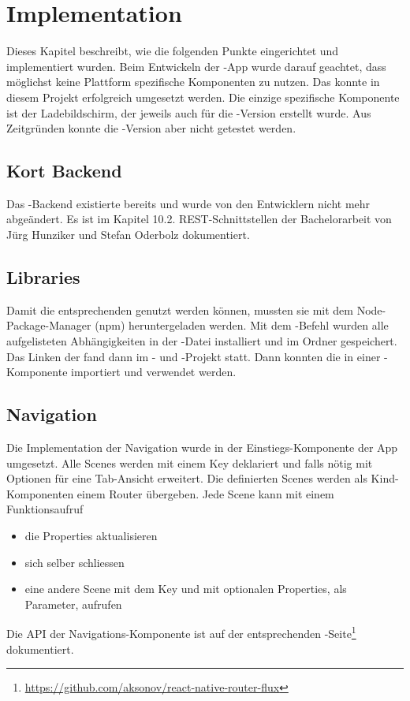 \chapter{Implementation}
\label{pd-implementation}
Dieses Kapitel beschreibt, wie die folgenden Punkte eingerichtet und implementiert wurden. 
Beim Entwickeln der -App wurde darauf geachtet, dass möglichst keine Plattform spezifische Komponenten zu nutzen. 
Das konnte in diesem Projekt erfolgreich umgesetzt werden. 
Die einzige spezifische Komponente ist der Ladebildschirm, der jeweils auch für die -Version erstellt wurde.
Aus Zeitgründen konnte die -Version aber nicht getestet werden. 


\section{Kort Backend}
Das \kort{}-Backend existierte bereits und wurde von den Entwicklern nicht mehr abgeändert. 
Es ist im Kapitel 10.2. \gls{REST}-Schnittstellen der Bachelorarbeit von Jürg Hunziker und Stefan Oderbolz dokumentiert.\cite{ba-kort-2012}


\section{Libraries}
Damit die entsprechenden  genutzt werden können, mussten sie mit dem Node-Package-Manager (npm) heruntergeladen werden. 
Mit dem -Befehl wurden alle aufgelisteten Abhängigkeiten in der  -Datei installiert und im Ordner \newline{} gespeichert.
Das Linken der  fand dann im - und -Projekt statt. 
Dann konnten die  in einer -Komponente importiert und verwendet werden. 


\section{Navigation}
Die Implementation der Navigation wurde in der Einstiegs-Komponente der App umgesetzt. 
Alle Scenes werden mit einem Key deklariert und falls nötig mit Optionen für eine Tab-Ansicht erweitert. 
Die definierten Scenes werden als Kind-Komponenten einem Router übergeben. 
Jede Scene kann mit einem Funktionsaufruf 
\begin{itemize}
	\item die Properties aktualisieren
	\item sich selber schliessen
	\item eine andere Scene mit dem Key und mit optionalen Properties, als Parameter, aufrufen
\end{itemize} 
Die \gls{API} der Navigations-Komponente ist auf der entsprechenden -Seite\footnote{\url{https://github.com/aksonov/react-native-router-flux}} dokumentiert. 


